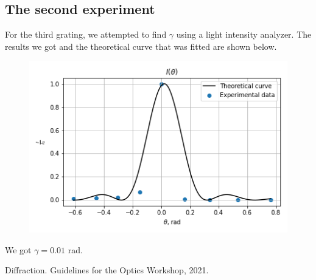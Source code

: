 \documentclass[a4paper, 12pt]{article}
\begin{document}
	\subsection*{The second experiment}
	For the third grating, we attempted to find $\gamma$ using a light intensity analyzer. The results we got and the theoretical curve that was fitted are shown below.
	\begin{figure}[H]
		\centering
		\includegraphics[width=0.85\linewidth]{gamma.png}
		\caption{}
		\label{fig:10}
	\end{figure}
	We got $\gamma = 0.01$ rad.
	
	
	\begin{thebibliography}{9}
		Diffraction.
		Guidelines for the Optics Workshop, 2021.
	\end{thebibliography}
\end{document}
